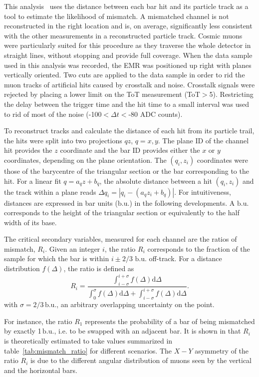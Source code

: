 \documentclass[a4paper,11pt]{article}
\begin{document}
This analysis~\cite{emr_xt, Francois} 
uses the distance between each bar hit and its particle track as a tool to estimate the likelihood of mismatch. A mismatched channel is
not reconstructed in the right location and is, on average, significantly less consistent with the other measurements in a reconstructed particle track.
Cosmic muons were particularly suited for this procedure as they traverse the whole detector in straight lines, without stopping and provide full coverage.
When the data sample used in this analysis was recorded, the EMR was positioned up right with planes vertically oriented. Two cuts are applied to the data sample
in order to rid the muon tracks of artificial hits caused by crosstalk and noise. Crosstalk signals were rejected by placing a lower limit on the ToT measurement (ToT$>$5).
Restricting the delay between the trigger time and the hit time to a small interval was used to rid of most of the noise (-100$<\Delta t<$-80 ADC counts). 

To reconstruct tracks and calculate
the distance of each hit from its particle trail, the hits were
split into two projections $qz$, $q=x,y$. The plane ID of the channel hit provides the $z$ coordinate and the bar ID provides either the $x$ or $y$ coordinates,
depending on the plane orientation. The $(q_i,z_i)$ coordinates were those of the barycentre of the triangular section or the bar corresponding to the hit. For
a linear fit $q=a_qz+b_q$, the absolute distance between a hit $(q_i,z_i)$ and the track within a plane reads $\Delta q_i=|q_i-(a_qz_i+b_q)|$. For intuitiveness,
distances are expressed in bar units ($\mathrm{b.u.}$) in the following developments. A $\mathrm{b.u.}$ corresponds to the height of the triangular section or
equivalently to the half width of its base.

The critical secondary variables, measured for each channel are the ratios of mismatch, $R_i$. Given an integer $i$, the ratio $R_i$ corresponds to the fraction
of the sample for which the bar is within $i\pm2/3$ $\mathrm{b.u.}$ off-track. For a distance distribution $f(\Delta)$, the ratio is defined as
\begin{equation}
R_i=\frac{\int_{i-\sigma}^{i+\sigma}f(\Delta)\mathrm{d}\Delta}{\int_{0}^{\sigma}f(\Delta)\mathrm{d}\Delta+\int_{i-\sigma}^{i+\sigma}f(\Delta)\mathrm{d}\Delta}.
\end{equation}
with $\sigma=2/3\,\mathrm{b.u.}$, an arbitrary overlapping uncertainty on the point.

For instance, the ratio $R_1$ represents the probability of a bar of being mismatched by exactly 1\,$\mathrm{b.u.}$, i.e. to be swapped with an adjacent bar.
It is shown in \cite{Francois} that $R_i$ is theoretically estimated to take values summarized in table~\ref{tab:mismatch_ratio} for different scenarios.
The $X-Y$ asymmetry of the ratio $R_i$ is due to the different angular distribution of muons seen by the vertical and the horizontal bars.
\end{document}
